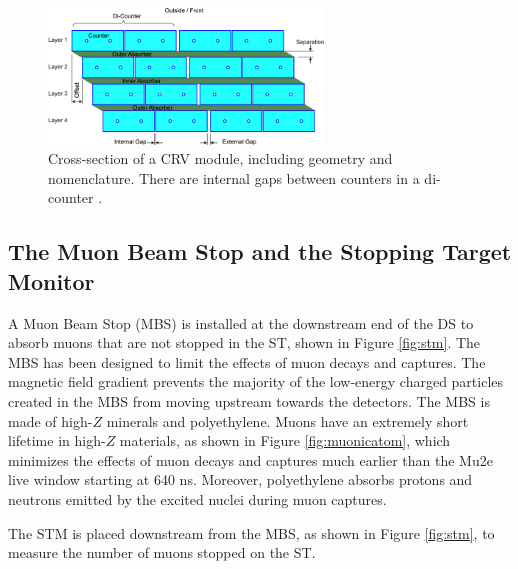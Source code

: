 \begin{figure}[!h]
\centering
\includegraphics[width =0.65\textwidth]{figures/png/Crv_module_geometry.png}
\caption[The cross-section of a CRV module.]{Cross-section of a CRV module, including geometry and nomenclature. 
There are internal gaps between counters in a di-counter \cite{Giovannella_2020}.}
\label{fig:crvmodule}
\end{figure}
\subsection{The Muon Beam Stop and the Stopping Target Monitor}
A Muon Beam Stop (MBS) is installed at the downstream end of the DS to 
absorb muons that are not stopped in the ST, shown in Figure \ref{fig:stm}. 
The MBS has been designed to limit the effects of muon decays and captures. 
The magnetic field gradient prevents the majority of the low-energy charged 
particles created in the MBS from moving upstream towards the detectors.  
The MBS is made of high-$Z$ minerals and polyethylene. Muons have an extremely short lifetime in 
high-$Z$ materials, as shown in Figure \ref{fig:muonicatom}, which minimizes the effects of muon 
decays and captures much earlier than the Mu2e live window starting at 640 ns. Moreover, polyethylene 
absorbs protons and neutrons emitted by the excited nuclei during muon captures.  

The STM is placed downstream from the MBS, as shown in Figure \ref{fig:stm}, 
to measure the number of muons stopped on the ST.

